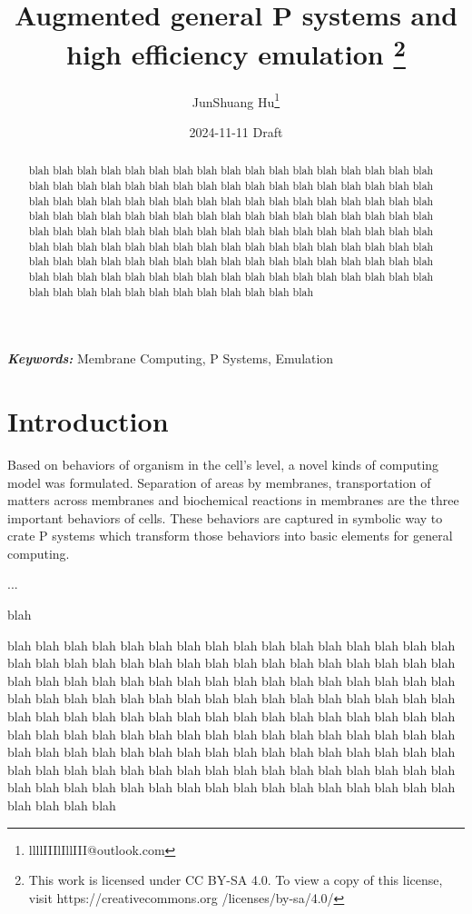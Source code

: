 \documentclass[9pt,a4paper,twoside]{article}
\title{
    Augmented general P systems and high efficiency emulation
    \footnote{
        This work is licensed under CC BY-SA 4.0. To view a copy of this license, visit 
        https://creativecommons.org /licenses/by-sa/4.0/
    }
}
\date{2024-11-11 Draft}
\author{JunShuang Hu\footnote{llllIIIlIllIII@outlook.com}}
\providecommand{\keywords}[1]{\textbf{\textit{Keywords:}} #1}
\begin{document}
    
    \maketitle
    
    \begin{abstract}
        blah blah blah blah blah blah blah blah blah blah blah blah blah blah blah blah blah blah blah blah blah blah blah blah blah blah blah blah blah blah blah blah blah blah blah blah blah blah blah blah blah blah blah blah blah blah blah blah blah blah blah blah blah blah blah blah blah blah blah blah blah blah blah blah blah blah blah blah blah blah blah blah blah blah blah blah blah blah blah blah blah blah blah blah blah blah blah blah blah blah blah blah blah blah blah blah blah blah blah blah blah blah blah blah blah blah blah blah blah blah blah blah blah blah blah blah blah blah blah blah blah blah blah blah blah blah blah blah blah blah blah blah blah blah blah blah blah blah blah blah blah blah blah blah blah blah blah blah 
    \end{abstract}
    \keywords{Membrane Computing, P Systems, Emulation}
    
    \section{Introduction}
    
        Based on behaviors of organism in the cell's level, a novel kinds of computing model was formulated. Separation of areas by membranes,
        transportation of matters across membranes and biochemical reactions in membranes are the three important behaviors of cells. 
        These behaviors are captured in symbolic way to crate P systems which transform those behaviors into basic elements for general computing.
        
        ...  
        
        blah
        
        blah blah blah blah blah blah blah blah blah blah blah blah blah blah blah blah blah blah blah blah blah blah blah blah blah blah blah blah blah blah blah blah blah blah blah blah blah blah blah blah blah blah blah blah blah blah blah blah blah blah blah blah blah blah blah blah blah blah blah blah blah blah blah blah blah blah blah blah blah blah blah blah blah blah blah blah blah blah blah blah blah blah blah blah blah blah blah blah blah blah blah blah blah blah blah blah blah blah blah blah blah blah blah blah blah blah blah blah blah blah blah blah blah blah blah blah blah blah blah blah blah blah blah blah blah blah blah blah blah blah blah blah blah blah blah blah blah blah blah blah blah blah blah blah blah blah blah blah 
\end{document}

